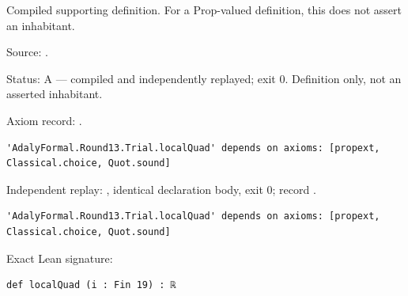 \begin{definition}[bp-418]
\label{bp-418}
\leanok
Compiled supporting definition. For a Prop-valued definition, this does not assert an inhabitant.

\par Source: \texttt{}.
\par Status: A — compiled and independently replayed; exit 0. Definition only, not an asserted inhabitant.
\par Axiom record: \texttt{}.
\begin{verbatim}
'AdalyFormal.Round13.Trial.localQuad' depends on axioms: [propext, Classical.choice, Quot.sound]
\end{verbatim}
\par Independent replay: \texttt{}, identical declaration body, exit 0; record \texttt{}.
\begin{verbatim}
'AdalyFormal.Round13.Trial.localQuad' depends on axioms: [propext, Classical.choice, Quot.sound]
\end{verbatim}
\par Exact Lean signature:
\begin{verbatim}
def localQuad (i : Fin 19) : ℝ
\end{verbatim}
\end{definition}

